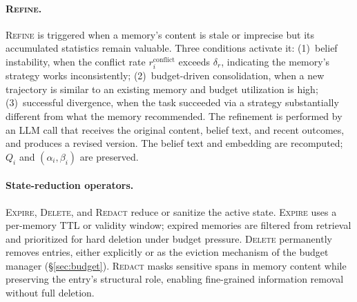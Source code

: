 \paragraph{\textsc{Refine}.}
\textsc{Refine} is triggered when a memory's content is stale or imprecise but its accumulated statistics remain valuable. Three conditions activate it: (1)~belief instability, when the conflict rate $r_i^{\mathrm{conflict}}$ exceeds $\delta_r$, indicating the memory's strategy works inconsistently; (2)~budget-driven consolidation, when a new trajectory is similar to an existing memory and budget utilization is high; (3)~successful divergence, when the task succeeded via a strategy substantially different from what the memory recommended. The refinement is performed by an LLM call that receives the original content, belief text, and recent outcomes, and produces a revised version. The belief text and embedding are recomputed; $Q_i$ and $(\alpha_i, \beta_i)$ are preserved.

\paragraph{State-reduction operators.}
\textsc{Expire}, \textsc{Delete}, and \textsc{Redact} reduce or sanitize the active state. \textsc{Expire} uses a per-memory TTL or validity window; expired memories are filtered from retrieval and prioritized for hard deletion under budget pressure. \textsc{Delete} permanently removes entries, either explicitly or as the eviction mechanism of the budget manager (\S\ref{sec:budget}). \textsc{Redact} masks sensitive spans in memory content while preserving the entry's structural role, enabling fine-grained information removal without full deletion.
